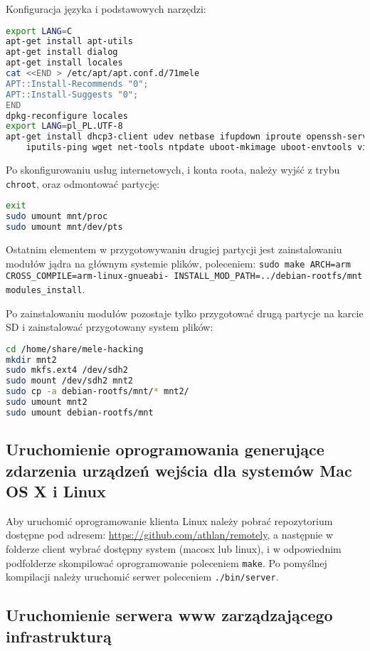 Konfiguracja języka i podstawowych narzędzi:
\begin{lstlisting}[language=bash]
export LANG=C
apt-get install apt-utils
apt-get install dialog
apt-get install locales
cat <<END > /etc/apt/apt.conf.d/71mele
APT::Install-Recommends "0";
APT::Install-Suggests "0";
END
dpkg-reconfigure locales
export LANG=pl_PL.UTF-8
apt-get install dhcp3-client udev netbase ifupdown iproute openssh-server \
    iputils-ping wget net-tools ntpdate uboot-mkimage uboot-envtools vim nano less X
\end{lstlisting}

Po skonfigurowaniu usług internetowych, i konta roota, należy wyjść z trybu \lstinline{chroot}, oraz odmontować partycję:

\begin{lstlisting}[language=bash]
exit
sudo umount mnt/proc
sudo umount mnt/dev/pts
\end{lstlisting}

Ostatnim elementem w przygotowywaniu drugiej partycji jest zainstalowaniu modułów jądra na głównym systemie plików, poleceniem: \lstinline{sudo make ARCH=arm CROSS_COMPILE=arm-linux-gnueabi- INSTALL_MOD_PATH=../debian-rootfs/mnt modules_install}.

Po zainstalowaniu modułów pozostaje tylko przygotować drugą partycje na karcie SD i zainstalować przygotowany system plików:
\begin{lstlisting}[language=bash]
cd /home/share/mele-hacking
mkdir mnt2
sudo mkfs.ext4 /dev/sdh2 
sudo mount /dev/sdh2 mnt2
sudo cp -a debian-rootfs/mnt/* mnt2/
sudo umount mnt2
sudo umount debian-rootfs/mnt
\end{lstlisting}

\subsection{Uruchomienie oprogramowania generujące zdarzenia urządzeń wejścia dla systemów Mac OS X i Linux}


Aby uruchomić oprogramowanie klienta Linux należy pobrać repozytorium dostępne pod adresem: \url{https://github.com/athlan/remotely}, a następnie w folderze client wybrać dostępny system (macosx lub linux), i w odpowiednim podfolderze skompilować oprogramowanie poleceniem \lstinline{make}.
Po pomyślnej kompilacji należy uruchomić serwer poleceniem \lstinline{./bin/server}.


\subsection{Uruchomienie serwera www zarządzającego infrastrukturą}

